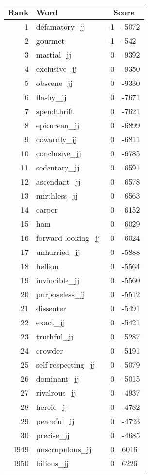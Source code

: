 \begin{longtable}[!htbp]{| rlr@{.}l |}
    \hline
    \textbf{Rank} & \textbf{Word} & \multicolumn{2}{c|}{\textbf{Score}} \\
    \hline
    \endhead
    1 & defamatory\_jj & -1 & -5072 \\
    2 & gourmet & -1 & -542 \\
    3 & martial\_jj & 0 & -9392 \\
    4 & exclusive\_jj & 0 & -9350 \\
    5 & obscene\_jj & 0 & -9330 \\
    6 & flashy\_jj & 0 & -7671 \\
    7 & spendthrift & 0 & -7621 \\
    8 & epicurean\_jj & 0 & -6899 \\
    9 & cowardly\_jj & 0 & -6811 \\
    10 & conclusive\_jj & 0 & -6785 \\
    11 & sedentary\_jj & 0 & -6591 \\
    12 & ascendant\_jj & 0 & -6578 \\
    13 & mirthless\_jj & 0 & -6563 \\
    14 & carper & 0 & -6152 \\
    15 & ham & 0 & -6029 \\
    16 & forward-looking\_jj & 0 & -6024 \\
    17 & unhurried\_jj & 0 & -5888 \\
    18 & hellion & 0 & -5564 \\
    19 & invincible\_jj & 0 & -5560 \\
    20 & purposeless\_jj & 0 & -5512 \\
    21 & dissenter & 0 & -5491 \\
    22 & exact\_jj & 0 & -5421 \\
    23 & truthful\_jj & 0 & -5287 \\
    24 & crowder & 0 & -5191 \\
    25 & self-respecting\_jj & 0 & -5079 \\
    26 & dominant\_jj & 0 & -5015 \\
    27 & rivalrous\_jj & 0 & -4937 \\
    28 & heroic\_jj & 0 & -4782 \\
    29 & peaceful\_jj & 0 & -4723 \\
    30 & precise\_jj & 0 & -4685 \\
    1949 & unscrupulous\_jj & 0 & 6016 \\
    1950 & bilious\_jj & 0 & 6226 \\

\end{longtable}
